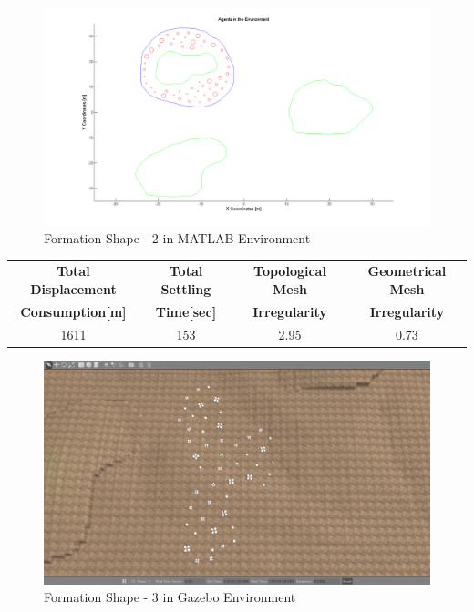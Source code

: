 \begin{figure}[H]
\caption{Formation Shape - 2 in MATLAB Environment}
\centerline{\includegraphics[scale = 0.40]{2}}
\end{figure} 
		 
\begin{center}
 \label{perf_shape2} 
\begin{tabular}{||c| c |c |c ||}
		 		
\hline
\textbf{Total Displacement }  & \textbf{Total Settling} & \textbf{Topological Mesh} & \textbf{Geometrical Mesh} \\ \textbf{Consumption[m]} & \textbf{Time[sec]}& \textbf{Irregularity} & \textbf{Irregularity} \\
\hline
1611 & 153 &  2.95& 0.73\\
\hline
\end{tabular}
\end{center}
		 
\begin{figure}[H]
\caption{Formation Shape - 3 in Gazebo Environment}
\centerline{\includegraphics[scale = 0.35]{3_Gazebo}}
\end{figure} 
				 
